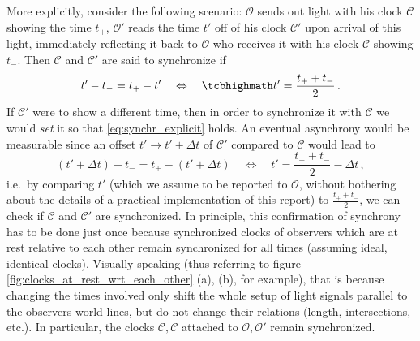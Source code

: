 More explicitly, consider the following scenario: $\mathcal{O}$ sends out light with his clock $\mathcal{C}$ showing the time $t_+$, $\mathcal{O}'$ reads the time $t'$ off of his clock $\mathcal{C}'$ upon arrival of this light, immediately reflecting it back to $\mathcal{O}$ who receives it with his clock $\mathcal{C}$ showing $t_-$. Then $\mathcal{C}$ and $\mathcal{C}'$ are said to synchronize if
\begin{equation}\label{eq:synchr_explicit}
	t' - t_- = t_+ - t'
	\quad \Leftrightarrow \quad
	\eqbox{
	t' = \frac{t_+ + t_-}{2}
	}
	\, .
\end{equation}
If $\mathcal{C}'$ were to show a different time, then in order to synchronize it with $\mathcal{C}$ we would \emph{set}%
 it so that \eqref{eq:synchr_explicit} holds.
 An eventual asynchrony would be measurable since an offset $t' \rightarrow t' + \Delta t$ of $\mathcal{C}'$ compared to $\mathcal{C}$ would lead to
\begin{equation}\label{eq:synchr_offset}
	(t' + \Delta t) - t_- = t_+ - (t' + \Delta t)
	\quad \Leftrightarrow \quad
	t' = \frac{t_+ + t_-}{2} - \Delta t \, ,
\end{equation}
i.e.~by comparing $t'$ (which we assume to be reported to $\mathcal{O}$, without bothering about the details of a practical implementation of this report) to $\frac{t_+ + t_-}{2}$, we can check if $\mathcal{C}$ and $\mathcal{C}'$ are synchronized. In principle, this confirmation of synchrony has to be done just once because synchronized clocks of observers which are at rest relative to each other remain synchronized for all times (assuming ideal, identical clocks). Visually speaking (thus referring to figure \ref{fig:clocks_at_rest_wrt_each_other} (a), (b), for example), that is because changing the times involved only shift the whole setup of light signals parallel to the observers world lines, but do not change their relations (length, intersections, etc.). In particular, the clocks $\mathcal{C}, \mathcal{C}$ attached to $\mathcal{O}, \mathcal{O}'$ remain synchronized.



